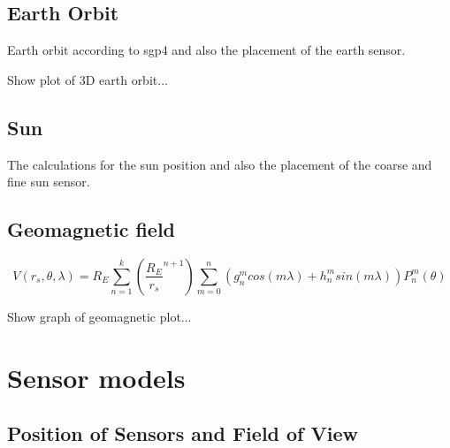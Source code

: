 \subsection{Earth Orbit}
Earth orbit according to sgp4 and also the placement of the earth sensor.

Show plot of 3D earth orbit...

\subsection{Sun}
The calculations for the sun position and also the placement of the coarse and fine sun sensor.

\subsection{Geomagnetic field}

\begin{equation}
V(r_s,\theta, \lambda) = R_E \sum_{n=1}^{k}\left(\frac{R_E}{r_s}^{n+1}\right)\sum_{m=0}^{n}\left(g_n^mcos(m\lambda) + h_n^msin(m\lambda)\right)P_n^m(\theta)
\end{equation}

Show graph of geomagnetic plot...

\section{Sensor models}
\subsection{Position of Sensors and Field of View}

